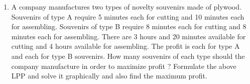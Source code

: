 
\begin{enumerate}

  \item A company manufactures two types of novelty souvenirs made of plywood. Souvenirs of type A require 5 minutes each for cutting and 10 minutes each for assembling. Souvenirs of type B require 8 minutes each for cutting and 8 minutes each for assembling. There are 3 hours and 20 minutes available for cutting and 4 hours available for assembling. The profit is  each for type A and  each for type B souvenirs. How many souvenirs of each type should the company 
manufacture in order to maximize profit ? Formulate the above LPP and solve it graphically and also find the maximum profit.

 \end{enumerate}
 
